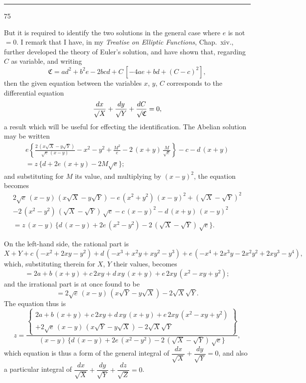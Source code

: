 \documentclass[11pt,a4paper]{book}
\begin{document}
\vspace{1ex}
\noindent\rule{2em}{0.4pt}\hfill 75

\newpage


But it is required to identify the two solutions in the general case where $e$ is not $=0$. I remark that I have, in my \textit{Treatise on Elliptic Functions}, Chap.~xiv., further developed the theory of Euler's solution, and have shown that, regarding $C$ as variable, and writing
\[
\mathfrak{C} = ad^2 + b^2e - 2bcd + C\,[-4ae + bd + (C-c)^2],
\]
then the given equation between the variables $x$, $y$, $C$ corresponds to the differential equation
\[
\frac{dx}{\surd X} + \frac{dy}{\surd Y} + \frac{dC}{\surd\mathfrak{C}} = 0,
\]
a result which will be useful for effecting the identification. The Abelian solution may be written
\begin{multline*}
e\left\{\frac{2\,(x\surd X - y\surd Y)}{\surd e\,(x-y)} - x^2 - y^2 + \frac{M^2}{e} - 2\,(x+y)\,\frac{M}{\surd e}\right\} - c - d\,(x+y) \\
= z\,\{d + 2e\,(x+y) - 2M\surd e\};
\end{multline*}
and substituting for $M$ its value, and multiplying by $(x-y)^2$, the equation becomes
\begin{multline*}
2\surd e\,(x-y)\,(x\surd X - y\surd Y) - e\,(x^2+y^2)\,(x-y)^2 + (\surd X - \surd Y)^2 \\
- 2\,(x^2-y^2)\,(\surd X - \surd Y)\,\surd e - c\,(x-y)^2 - d\,(x+y)\,(x-y)^2 \\
= z\,(x-y)\,\{d\,(x-y) + 2e\,(x^2-y^2) - 2\,(\surd X - \surd Y)\,\surd e\}.
\end{multline*}

On the left-hand side, the rational part is
\[
X + Y + c\,(-x^2 + 2xy - y^2) + d\,(-x^3 + x^2y + xy^2 - y^3) + e\,(-x^4 + 2x^3y - 2x^2y^2 + 2xy^3 - y^4),
\]
which, substituting therein for $X$, $Y$ their values, becomes
\[
= 2a + b\,(x+y) + c\,2xy + d\,xy\,(x+y) + e\,2xy\,(x^2 - xy + y^2);
\]
and the irrational part is at once found to be
\[
= 2\surd e\,(x-y)\,(x\surd Y - y\surd X) - 2\surd X\surd Y.
\]
The equation thus is
\[
z = \frac{\left\{\begin{aligned} 2a + b\,(x+y) + c\,2xy + d\,xy\,(x+y) + e\,2xy\,(x^2-xy+y^2) \\ + 2\surd e\,(x-y)\,(x\surd Y - y\surd X) - 2\surd X\surd Y \end{aligned}\right\}}{(x-y)\,\{d\,(x-y) + 2e\,(x^2-y^2) - 2\,(\surd X - \surd Y)\,\surd e\}},
\]
which equation is thus a form of the general integral of $\dfrac{dx}{\surd X} + \dfrac{dy}{\surd Y} = 0$, and also a particular integral of $\dfrac{dx}{\surd X} + \dfrac{dy}{\surd Y} + \dfrac{dz}{\surd Z} = 0$.
\end{document}
